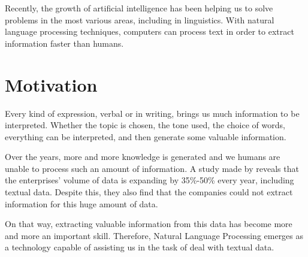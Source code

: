 Recently, the growth of artificial intelligence has been helping us to solve problems in the most various areas, including in linguistics. With natural language processing techniques, computers can process text in order to extract information faster than humans.

\section{Motivation}




Every kind of expression, verbal or in writing, brings us much information to be interpreted. Whether the topic is chosen, the tone used, the choice of words, everything can be interpreted, and then generate some valuable information. 

Over the years, more and more knowledge is generated and we humans are unable to process such an amount of information. A study made by  reveals that the enterprises' volume of data is expanding by 35\%-50\% every year, including textual data. Despite this, they also find that the companies could not extract information for this huge amount of data.

On that way, extracting valuable information from this data has  become more and more an important skill. Therefore, Natural Language Processing emerges as a technology capable of assisting us in the task of deal with textual data.

